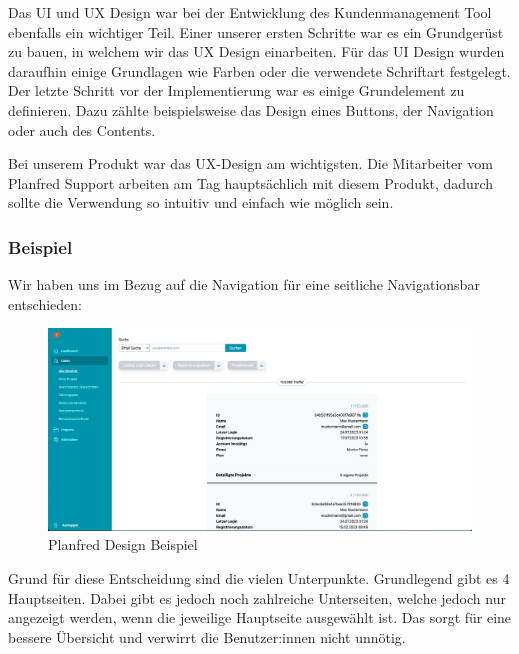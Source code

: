 Das UI und UX Design war bei der Entwicklung des Kundenmanagement Tool ebenfalls ein wichtiger Teil. Einer unserer ersten Schritte war es ein Grundgerüst zu bauen, in welchem wir das UX Design einarbeiten. Für das UI Design wurden daraufhin einige Grundlagen wie Farben oder die verwendete Schriftart festgelegt. Der letzte Schritt vor der Implementierung war es einige Grundelement zu definieren. Dazu zählte beispielsweise das Design eines Buttons, der Navigation oder auch des Contents.

Bei unserem Produkt war das UX-Design am wichtigsten. Die Mitarbeiter vom Planfred Support arbeiten am Tag hauptsächlich mit diesem Produkt, dadurch sollte die Verwendung so intuitiv und einfach wie möglich sein.

\subsubsection{Beispiel}
Wir haben uns im Bezug auf die Navigation für eine seitliche Navigationsbar entschieden:

\begin{figure}[h!]
    \centering
    \includegraphics[width=1\textwidth]{pics/planfred-ui-ux-example.png}
    \caption{Planfred Design Beispiel}
    \label{fig:mesh1}
\end{figure}

Grund für diese Entscheidung sind die vielen Unterpunkte. Grundlegend gibt es 4 Hauptseiten. Dabei gibt es jedoch noch zahlreiche Unterseiten, welche jedoch nur angezeigt werden, wenn die jeweilige Hauptseite ausgewählt ist. Das sorgt für eine bessere Übersicht und verwirrt die Benutzer:innen nicht unnötig. 